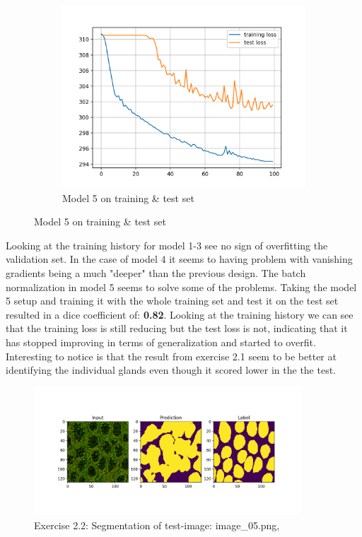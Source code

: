 \documentclass[a4paper,10pt]{article}
\begin{document}
\begin{figure}[htbp]
\begin{subfigure}{0.3\textwidth}
    \includegraphics[width=\textwidth]{figures/assignment_3/segmentation_model6.png}
    \caption{Model 5 on training \& test set}
    \label{fig:image2}
  \end{subfigure}
  \label{fig:both_images}





\end{figure}


Looking at the training history for model 1-3 see no sign of overfitting the validation set. In the case of model 4 it seems to having problem with vanishing gradients being a much "deeper" than the previous design. The batch normalization in model 5 seems to solve some of the problems.
Taking the model 5 setup and training it with the whole training set and test it on the test set resulted in a dice coefficient of: \textbf{0.82}. Looking at the training history we can see that the training loss is still reducing but the test loss is not, indicating that it has stopped improving in terms of generalization and started to overfit. Interesting to notice is that the result from exercise 2.1 seem to be better at identifying the individual glands even though it scored lower in the the test.

 \begin{figure}[ht!]
\centering
\includegraphics[width=100mm]{figures/assignment_3/segmentation_test_best.png}
\caption{Exercise 2.2: Segmentation of test-image: image\_05.png, }
\label{fig:segexample}
\end{figure}
\end{document}
